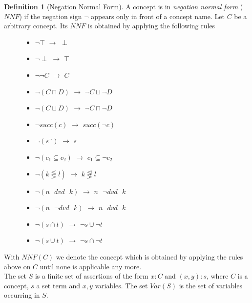 \documentclass[a4paper,11pt]{scrartcl}
\theoremstyle{break}
\theoremstyle{definition}
\newtheorem{mydef}{Definition}
\begin{document}
\begin{mydef}[Negation Normal Form]
A concept is in \textit{negation normal form} ($NNF$) if the negation sign $\neg$ appears only in front of a concept name. Let $C$ be a arbitrary concept. Its $NNF$ is obtained by applying the following rules
\begin{figure}[H]
\begin{minipage}[t]{.5\textwidth}
\raggedright
\begin{itemize}
\item $\neg\top$ $\rightarrow$ $\perp$
\item $\neg\perp$ $\rightarrow$ $\top$
\item $\neg\neg C$ $\rightarrow$ $C$
\item $\neg(C\sqcap D)$ $\rightarrow$ $\neg C \sqcup \neg D$
\item $\neg(C\sqcup D)$ $\rightarrow$ $\neg C \sqcap \neg D$
\item $\neg succ(c)$ $\rightarrow$ $succ(\neg c)$
\item $\neg (s^\neg)$ $\rightarrow$ $s$
\end{itemize}
\end{minipage}%
\begin{minipage}[t]{.5\textwidth}
\raggedleft
\begin{itemize}
\item $\neg (c_1\subseteq c_2)$ $\rightarrow$ $c_1\subseteq \neg c_2$
\item $\neg (k\lesseqgtr l)$ $\rightarrow$ $k\not\lesseqgtr l$
\item $\neg (n\text{ } dvd \text{ } k)$ $\rightarrow$ $n\text{ } \neg dvd \text{ } k$
\item $\neg (n\text{ } \neg dvd \text{ } k)$ $\rightarrow$ $n\text{ } dvd \text{ } k$
\item $\neg (s\cap t)$ $\rightarrow$ $\neg s \cup \neg t$
\item $\neg (s\cup t)$ $\rightarrow$ $\neg s \cap \neg t$
\end{itemize}
\end{minipage}
\end{figure}
\end{mydef}
With $NNF(C)$ we denote the concept which is obtained by applying the rules above on $C$ until none is applicable any more.\\
The set $S$ is a finite set of assertions of the form $x:C$ and $(x,y):s$, where $C$ is a concept, $s$ a set term and $x,y$ variables. The set $Var(S)$ is the set of variables occurring in $S$.
\end{document}
